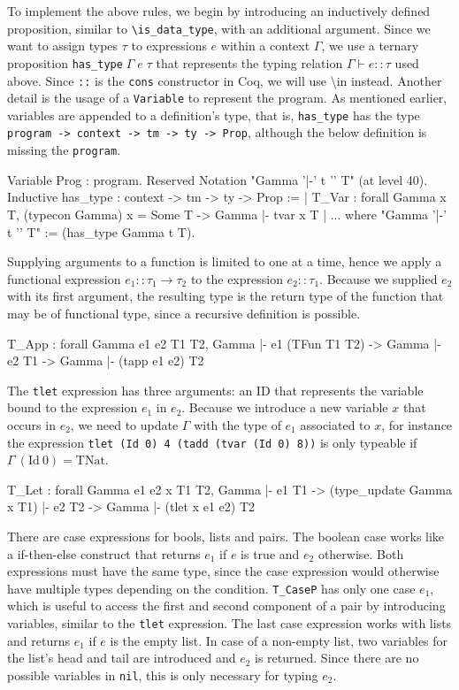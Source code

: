\documentclass[fleqn]{scrreprt}
\newcommand{\coqinline}[1]{\texttt{#1}}
\begin{document}
\par
To implement the above rules, we begin by introducing an inductively defined proposition, similar to \texttt{\textbackslash is\_data\_type}, with an additional argument. Since we want to assign types $\tau$ to expressions $e$ within a context $\Gamma$, we use a ternary proposition \coqinline{has_type}$\; \Gamma \; e \; \tau$ that represents the typing relation $\Gamma \vdash e :: \tau$ used above. Since \coqinline{::} is the \coqinline{cons} constructor in Coq, we will use \textbackslash in instead. Another detail is the usage of a \coqinline{Variable} to represent the program. As mentioned earlier, variables are appended to a definition's type, that is, \coqinline{has_type} has the type \coqinline{program -> context -> tm -> ty -> Prop}, although the below definition is missing the \coqinline{program}.
\begin{coqcode}
Variable Prog : program.
Reserved Notation "Gamma '|-' t '\in' T" (at level 40).
Inductive has_type : context -> tm -> ty -> Prop :=
  | T_Var : forall Gamma x T, (typecon Gamma) x = Some T ->
              Gamma |- tvar x \in T
  | ...
where "Gamma '|-' t '\in' T" := (has_type Gamma t T).
\end{coqcode}
Supplying arguments to a function is limited to one at a time, hence we apply a functional expression $e_{1} :: \tau_{1} \rightarrow \tau_{2}$ to the expression $e_{2} :: \tau_{1}$. Because we supplied $e_{2}$ with its first argument, the resulting type is the return type of the function that may be of functional type, since a recursive definition is possible.
\begin{coqcode}
T_App : forall Gamma e1 e2 T1 T2,
          Gamma |- e1 \in (TFun T1 T2) -> Gamma |- e2 \in T1 ->
          Gamma |- (tapp e1 e2) \in T2
\end{coqcode}
The \coqinline{tlet} expression has three arguments: an ID that represents the variable bound to the expression $e_{1}$ in $e_{2}$. Because we introduce a new variable $x$ that occurs in $e_{2}$, we need to update $\Gamma$ with the type of $e_{1}$ associated to $x$, for instance the expression \coqinline{tlet (Id 0) 4 (tadd (tvar (Id 0) 8))} is only typeable if $\Gamma \:(\text{Id}\: 0) = \text{TNat}$.
\begin{coqcode}
T_Let : forall Gamma e1 e2 x T1 T2,
          Gamma |- e1 \in T1 -> (type_update Gamma x T1) |- e2 \in T2 ->
          Gamma |- (tlet x e1 e2) \in T2
\end{coqcode}
There are case expressions for bools, lists and pairs. The boolean case works like a if-then-else construct that returns $e_{1}$ if $e$ is true and $e_{2}$ otherwise. Both expressions must have the same type, since the case expression would otherwise have multiple types depending on the condition. \coqinline{T_CaseP} has only one case $e_{1}$, which is useful to access the first and second component of a pair by introducing variables, similar to the \coqinline{tlet} expression. The last case expression works with lists and returns $e_{1}$ if $e$ is the empty list. In case of a non-empty list, two variables for the list's head and tail are introduced and $e_{2}$ is returned. Since there are no possible variables in \coqinline{nil}, this is only necessary for typing $e_{2}$.
\end{document}
